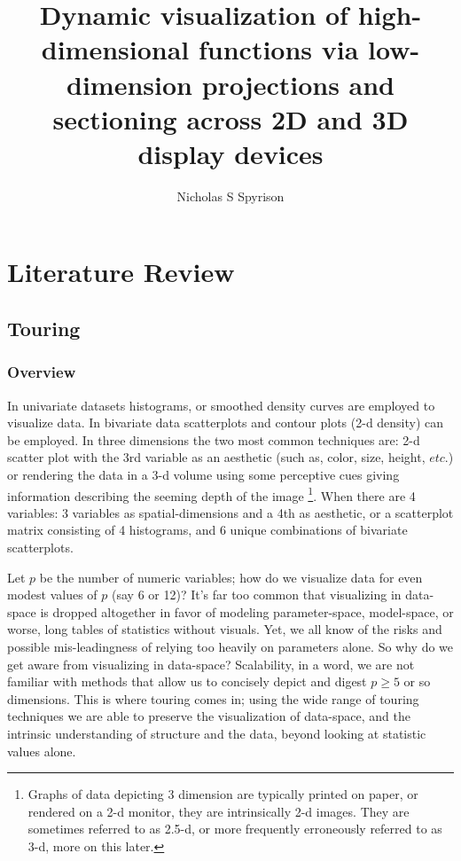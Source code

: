 \documentclass{monashthesis}
\author{Nicholas S Spyrison}
\title{Dynamic visualization of high-dimensional functions via low-dimension
projections and sectioning across 2D and 3D display devices}
\begin{document}

\titlepage

{\sf\tighttoc\doublespacing}

\chapter{Literature Review}\label{ch:litreview}

\section{Touring}\label{sec:tour}

\subsection{Overview}\label{overview}

In univariate datasets histograms, or smoothed density curves are
employed to visualize data. In bivariate data scatterplots and contour
plots (2-d density) can be employed. In three dimensions the two most
common techniques are: 2-d scatter plot with the 3rd variable as an
aesthetic (such as, color, size, height, \(etc.\)) or rendering the data
in a 3-d volume using some perceptive cues giving information describing
the seeming depth of the image
\footnote{Graphs of data depicting 3 dimension are typically printed on paper, or rendered on a 2-d monitor, they are intrinsically 2-d images. They are sometimes referred to as 2.5-d, or more frequently erroneously referred to as 3-d, more on this later.}.
When there are 4 variables: 3 variables as spatial-dimensions and a 4th
as aesthetic, or a scatterplot matrix consisting of 4 histograms, and 6
unique combinations of bivariate scatterplots.

Let \(p\) be the number of numeric variables; how do we visualize data
for even modest values of \(p\) (say 6 or 12)? It's far too common that
visualizing in data-space is dropped altogether in favor of modeling
parameter-space, model-space, or worse, long tables of statistics
without visuals\autocite{wickham_visualizing_2015}. Yet, we all know of
the risks and possible mis-leadingness of relying too heavily on
parameters alone\autocites{anscombe_graphs_1973}{matejka_same_2017}. So
why do we get aware from visualizing in data-space? Scalability, in a
word, we are not familiar with methods that allow us to concisely depict
and digest \(p \geq 5\) or so dimensions. This is where touring comes
in; using the wide range of touring techniques we are able to preserve
the visualization of data-space, and the intrinsic understanding of
structure and the data, beyond looking at statistic values alone.
\end{document}
